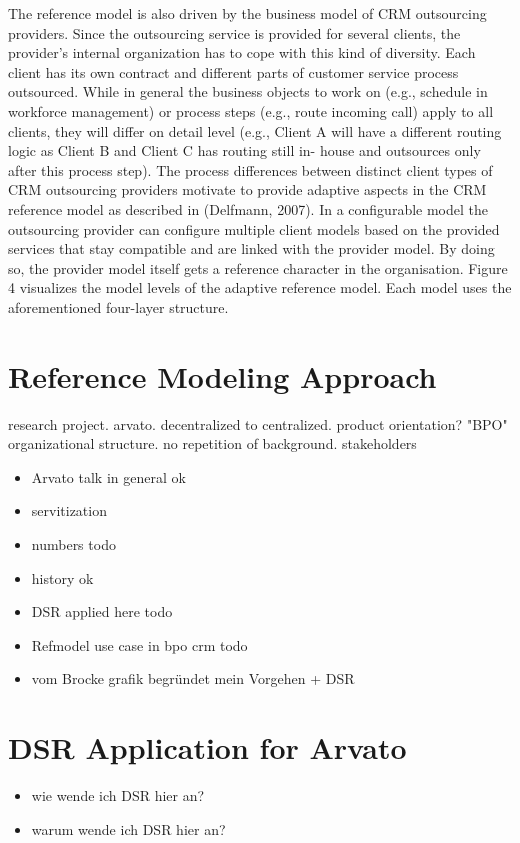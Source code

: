 %
The reference model is also driven by the business model of CRM outsourcing providers. Since the outsourcing service is provided for several clients, the provider’s internal organization has to cope with this kind of diversity. Each client has its own contract and different parts of customer service process outsourced. While in general the business objects to work on (e.g., schedule in workforce management) or process steps (e.g., route incoming call) apply to all clients, they will differ on detail level (e.g., Client A will have a different routing logic as Client B and Client C has routing still in- house and outsources only after this process step).
The process differences between distinct client types of CRM outsourcing providers motivate to provide adaptive aspects in the CRM reference model as described in (Delfmann, 2007). In a configurable model the outsourcing provider can configure multiple client models based on the provided services that stay compatible and are linked with the provider model. By doing so, the provider model itself gets a reference character in the organisation. Figure 4 visualizes the model levels of the adaptive reference model. Each model uses the aforementioned four-layer structure.
%
\section{Reference Modeling Approach}
research project. 
arvato. 
decentralized to centralized.
product orientation?
"BPO" 
organizational structure. no repetition of background.
stakeholders

\begin{itemize}
	\item Arvato talk in general ok
	\item servitization
	\item numbers todo
	\item history ok
	\item DSR applied here todo
	\item Refmodel use case in bpo crm todo
	\item vom Brocke grafik begründet mein Vorgehen + DSR
\end{itemize}
\section{DSR Application for Arvato}
\begin{itemize}
	\item wie wende ich DSR hier an?
	\item warum wende ich DSR hier an?
	
\end{itemize}
